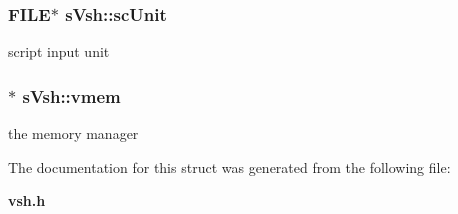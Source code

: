 \subsubsection[{scUnit}]{\setlength{\rightskip}{0pt plus 5cm}FILE$\ast$ {\bf sVsh::scUnit}}\label{a00007_a471927ccabdbbb75601d1d406e8cbc76}


script input unit 

\subsubsection[{vmem}]{$\ast$ {\bf sVsh::vmem}}\label{a00007_a6ff199aeb0841047c1c4cd0a42f3c23a}


the memory manager 



The documentation for this struct was generated from the following file:\begin{DoxyCompactItemize}
\item 
{\bf vsh.h}\end{DoxyCompactItemize}
